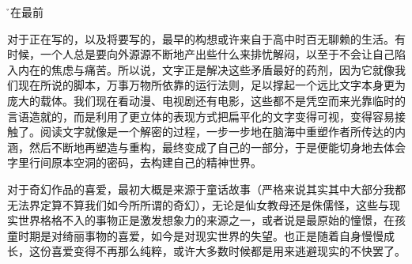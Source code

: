 \h*{写在最前}

对于正在写的，以及将要写的，最早的构想或许来自于高中时百无聊赖的生活。有时候，一个人总是要向外源源不断地产出些什么来排忧解闷，以至于不会让自己陷入内在的焦虑与痛苦。所以说，文字正是解决这些矛盾最好的药剂，因为它就像我们现在所说的脚本，万事万物所依靠的运行法则，足以撑起一个远比文字本身更为庞大的载体。我们现在看动漫、电视剧还有电影，这些都不是凭空而来光靠临时的言语造就的，而是利用了更立体的表现方式把扁平化的文字变得可视，变得容易接触了。阅读文字就像是一个解密的过程，一步一步地在脑海中重塑作者所传达的内涵，然后不断地再塑造与重构，最终变成了自己的一部分，于是便能切身地去体会字里行间原本空洞的密码，去构建自己的精神世界。

对于奇幻作品的喜爱，最初大概是来源于童话故事（严格来说其实其中大部分我都无法界定算不算我们如今所所谓的奇幻），无论是仙女教母还是侏儒怪，这些与现实世界格格不入的事物正是激发想象力的来源之一，或者说是最原始的憧憬，在孩童时期是对绮丽事物的喜爱，如今是对现实世界的失望。也正是随着自身慢慢成长，这份喜爱变得不再那么纯粹，或许大多数时候都是用来逃避现实的不快罢了。